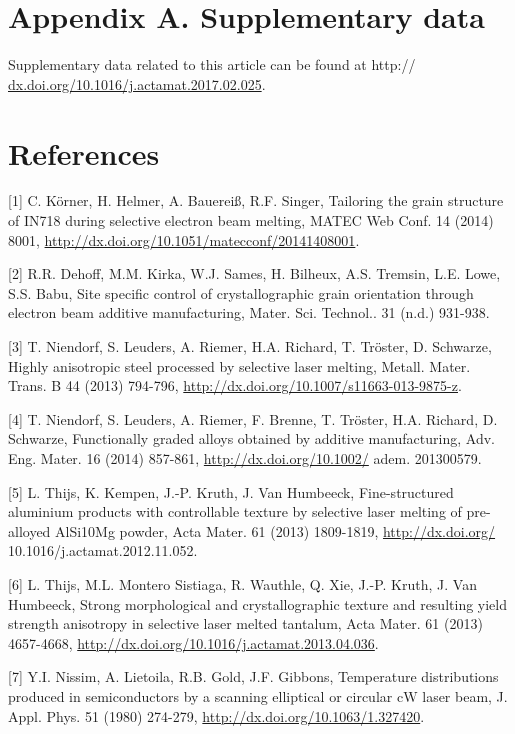 \documentclass[10pt]{article}
\begin{document}
\section*{Appendix A. Supplementary data}
Supplementary data related to this article can be found at http:// \href{http://dx.doi.org/10.1016/j.actamat.2017.02.025}{dx.doi.org/10.1016/j.actamat.2017.02.025}.

\section*{References}
[1] C. Körner, H. Helmer, A. Bauereiß, R.F. Singer, Tailoring the grain structure of IN718 during selective electron beam melting, MATEC Web Conf. 14 (2014) 8001, \href{http://dx.doi.org/10.1051/matecconf/20141408001}{http://dx.doi.org/10.1051/matecconf/20141408001}.

[2] R.R. Dehoff, M.M. Kirka, W.J. Sames, H. Bilheux, A.S. Tremsin, L.E. Lowe, S.S. Babu, Site specific control of crystallographic grain orientation through electron beam additive manufacturing, Mater. Sci. Technol.. 31 (n.d.) 931-938.

[3] T. Niendorf, S. Leuders, A. Riemer, H.A. Richard, T. Tröster, D. Schwarze, Highly anisotropic steel processed by selective laser melting, Metall. Mater. Trans. B 44 (2013) 794-796, \href{http://dx.doi.org/10.1007/s11663-013-9875-z}{http://dx.doi.org/10.1007/s11663-013-9875-z}.

[4] T. Niendorf, S. Leuders, A. Riemer, F. Brenne, T. Tröster, H.A. Richard, D. Schwarze, Functionally graded alloys obtained by additive manufacturing, Adv. Eng. Mater. 16 (2014) 857-861, \href{http://dx.doi.org/10.1002/}{http://dx.doi.org/10.1002/} adem. 201300579.

[5] L. Thijs, K. Kempen, J.-P. Kruth, J. Van Humbeeck, Fine-structured aluminium products with controllable texture by selective laser melting of pre-alloyed AlSi10Mg powder, Acta Mater. 61 (2013) 1809-1819, \href{http://dx.doi.org/}{http://dx.doi.org/} 10.1016/j.actamat.2012.11.052.

[6] L. Thijs, M.L. Montero Sistiaga, R. Wauthle, Q. Xie, J.-P. Kruth, J. Van Humbeeck, Strong morphological and crystallographic texture and resulting yield strength anisotropy in selective laser melted tantalum, Acta Mater. 61 (2013) 4657-4668, \href{http://dx.doi.org/10.1016/j.actamat.2013.04.036}{http://dx.doi.org/10.1016/j.actamat.2013.04.036}.

[7] Y.I. Nissim, A. Lietoila, R.B. Gold, J.F. Gibbons, Temperature distributions produced in semiconductors by a scanning elliptical or circular $\mathrm{cW}$ laser beam, J. Appl. Phys. 51 (1980) 274-279, \href{http://dx.doi.org/10.1063/1.327420}{http://dx.doi.org/10.1063/1.327420}.
\end{document}
